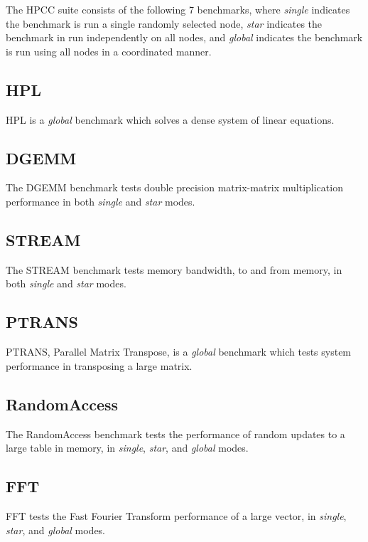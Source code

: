 \documentclass{report}
\begin{document}
The HPCC suite consists of the following 7 benchmarks, where \emph{single} indicates the benchmark is run a single randomly selected node, \emph{star} indicates the benchmark in run independently on all nodes, and \emph{global} indicates the benchmark is run using all nodes in a coordinated manner. 


%
%
\subsection{HPL}

HPL is a \emph{global} benchmark which solves a dense system of linear equations.


%
%
\subsection{DGEMM}

The DGEMM benchmark tests double precision matrix-matrix multiplication performance in both \emph{single} and \emph{star} modes.

 
%
%
\subsection{STREAM}

The STREAM benchmark tests memory bandwidth, to and from memory, in both \emph{single} and \emph{star} modes.


%
%
\subsection{PTRANS}

PTRANS, Parallel Matrix Transpose, is a \emph{global} benchmark which tests system performance in transposing a large matrix.


%
%
\subsection{RandomAccess}

The RandomAccess benchmark tests the performance of random updates to a large table in memory, in \emph{single}, \emph{star}, and \emph{global} modes.


%
%
\subsection{FFT}

FFT tests the Fast Fourier Transform performance of a large vector, in \emph{single}, \emph{star}, and \emph{global} modes.
\end{document}
